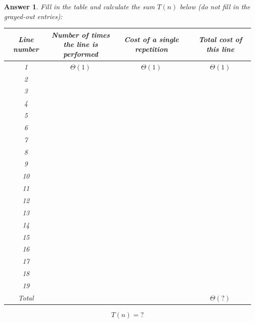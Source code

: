 \documentclass[a4paper]{article}
\theoremstyle{remarksStyle}
\theoremstyle{questionStyle}
\theoremstyle{answerStyle}
\newtheorem{answer}{Answer}
\begin{document}
\begin{answer}
    Fill in the table and calculate the sum $T(n)$ below (do not fill in the grayed-out entries):
\begin{center}    
\begin{tabular}{||c | c | c | c ||} 
 \hline
 Line number & \makecell{Number of times \\ the line is performed} & Cost of a single repetition & Total cost of this line \\ [0.5ex] 
 \hline\hline
 1 & $\Theta(1)$ & $\Theta(1)$ & $\Theta (1)$  \\ 
 \hline
 2 & & &  \\
 \hline
 3 & & & \\ 
  \hline
 4 & & & \\ 
   \hline
 5 & & & \\ 
  \hline
 6 & & & \\ 
    \hline
 7 & & & \\ 
 \hline
 8 & \cellcolor{Gray} & \cellcolor{Gray} & \cellcolor{Gray} \\ 
 \hline
 9 & \cellcolor{Gray} & \cellcolor{Gray} & \cellcolor{Gray} \\ 
 \hline
 10 & & & \\ 
 \hline
 11 & & & \\ 
 \hline
 12 & & & \\ 
 \hline
 13 & & & \\ 
 \hline
  14 & & & \\ 
 \hline
 15 & \cellcolor{Gray} & \cellcolor{Gray} & \cellcolor{Gray} \\ 
 \hline
 16 & & & \\ 
 \hline
 17 & \cellcolor{Gray} & \cellcolor{Gray} & \cellcolor{Gray} \\
 \hline
 18 & \cellcolor{Gray} & \cellcolor{Gray} & \cellcolor{Gray} \\
 \hline
 19 & & & \\
 \hline
 Total & \cellcolor{Gray} & \cellcolor{Gray} & $\Theta (?)$  \\ 
 \hline
\end{tabular}
\end{center}
\[ T(n) = ?\]

\end{answer}

\newpage
\end{document}
